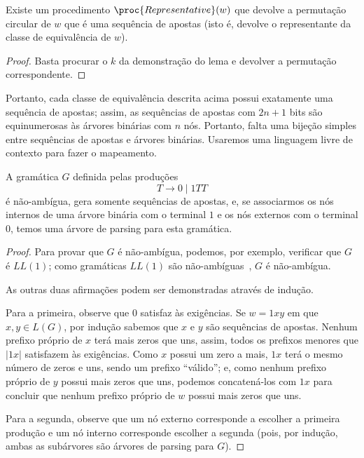 \begin{corollary}
    Existe um procedimento $\proc{Representative}(w)$
    que devolve a permutação circular de $w$ que é uma sequência de apostas
    (isto é, devolve o representante da classe de equivalência de $w$).
\end{corollary}

\begin{proof}
    Basta procurar o $k$ da demonstração do lema
    e devolver a permutação correspondente.
\end{proof}

Portanto, cada classe de equivalência descrita acima
possui exatamente uma sequência de apostas;
assim, as sequências de apostas com $2n+1$ bits
são equinumerosas às árvores binárias com $n$ nós.
Portanto,
falta uma bijeção simples entre sequências de apostas e árvores binárias.
Usaremos uma linguagem livre de contexto para fazer o mapeamento.

\begin{lemma}
    A gramática $G$ definida pelas produções
    \begin{equation*}
        T \to 0 \mid 1TT
    \end{equation*}
    é não-ambígua, gera somente sequências de apostas,
    e, se associarmos os nós internos de uma árvore binária com o terminal $1$
    e os nós externos com o terminal $0$,
    temos uma árvore de parsing para esta gramática.
\end{lemma}

\begin{proof}
    Para provar que $G$ é não-ambígua,
    podemos, por exemplo, verificar que $G$ é $LL(1)$; %
    como gramáticas $LL(1)$ são não-ambíguas~\cite[p.~233]{AhoLamSethiUllman2006},
    $G$ é não-ambígua.

    As outras duas afirmações podem ser demonstradas através de indução.

    Para a primeira,
    observe que $0$ satisfaz às exigências.
    Se $w = 1xy$ em que $x, y \in L(G)$,
    por indução sabemos que $x$ e $y$ são sequências de apostas.
    Nenhum prefixo próprio de $x$ terá mais zeros que uns,
    assim, todos os prefixos menores que $|1x|$ satisfazem às exigências.
    Como $x$ possui um zero a mais, $1x$ terá o mesmo número de zeros e uns,
    sendo um prefixo ``válido'';
    e, como nenhum prefixo próprio de $y$ possui mais zeros que uns,
    podemos concatená-los com $1x$ para concluir que
    nenhum prefixo próprio de $w$ possui mais zeros que uns.

    Para a segunda,
    observe que um nó externo corresponde a escolher a primeira produção
    e um nó interno corresponde escolher a segunda
    (pois, por indução, ambas as subárvores são árvores de parsing para $G$).
\end{proof}

